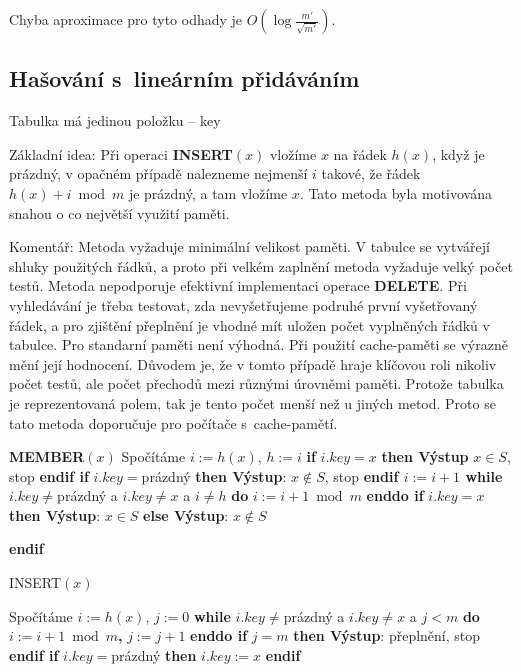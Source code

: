 \documentclass[a4paper,12pt]{article}
\begin{document}
Chyba aproximace pro tyto odhady je $O(\log\frac {m'}{\sqrt {
m'}})$.

\subsection{Hašování s~lineárním přidáváním}

Tabulka má jedinou položku -- key

Základní idea:  Při operaci {\bf INSERT$(x)$} vložíme $
x$ 
na řádek $h(x)$, když je prázdný, v opačném případě 
nalezneme nejmenší $i$ takové, že řádek $h(x)+i\bmod 
m$ je 
prázdný, a tam vložíme $x$. Tato metoda byla motivována snahou o co největší využití paměti. 

Komentář:  Metoda vyžaduje minimální velikost paměti.  
V tabulce se vytvářejí shluky použitých řádků, a proto 
při velkém zaplnění metoda vyžaduje velký počet testů.  
Metoda nepodporuje efektivní implementaci operace {\bf DELETE}.  
Při vy\-hle\-dá\-vá\-ní je třeba testovat, zda nevyšetřujeme 
podruhé první vyšetřovaný řádek, a pro zjištění přeplnění je 
vhodné mít uložen počet vyplněných řádků v tabulce. Pro standarní paměti není výhodná. Při použití cache-paměti se výrazně mění její hodnocení. Důvodem je, že v tomto případě hraje klíčovou roli nikoliv počet testů, ale počet přechodů mezi různými úrovněmi paměti. Protože tabulka je reprezentovaná polem, tak je tento počet menší než u jiných metod. Proto se tato metoda doporučuje pro počítače s~cache-pamětí.


{\bf MEMBER$(x)$}\newline 
Spočítáme $i:=h(x)$, $h:=i$\newline 
{\bf if} $i.key=x$ {\bf then Výstup} $x\in S$, stop {\bf endif\newline 
if} $i.key=$prázdný {\bf then {{\rm Výstup}}}: $x\notin S$, stop {\bf endif\newline 
$i:=i+1$\newline 
while} $i.key\ne$prázdný a $i.key\ne x$ a $i\ne h$ {\bf do} $
i:=i+1\bmod m$ {\bf enddo\newline 
if} $i.key=x$ {\bf then Výstup}: $x\in S$ {\bf else Výstup}: $
x\notin S$ {\bf endif


INSERT$(x)$}\newline 
Spočítáme $i:=h(x)$, $j:=0$\newline 
{\bf while} $i.key\ne$prázdný a $i.key\ne x$ a $j<m$ {\bf do} $
i:=i+1\bmod m${\bf ,} $j:=j+1$ {\bf enddo\newline 
if} $j=m$ {\bf then Výstup}: přeplnění, stop {\bf endif\newline 
if} $i.key=$prázdný {\bf then} $i.key:=x$ {\bf endif}
\end{document}
